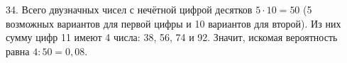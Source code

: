 34. Всего двузначных чисел с нечётной цифрой десятков $5\cdot10=50$ (5 возможных вариантов для первой цифры и 10 вариантов для второй). Из них сумму цифр 11 имеют
4 числа: 38, 56, 74 и 92. Значит, искомая вероятность равна $4:50=0,08.$\\
